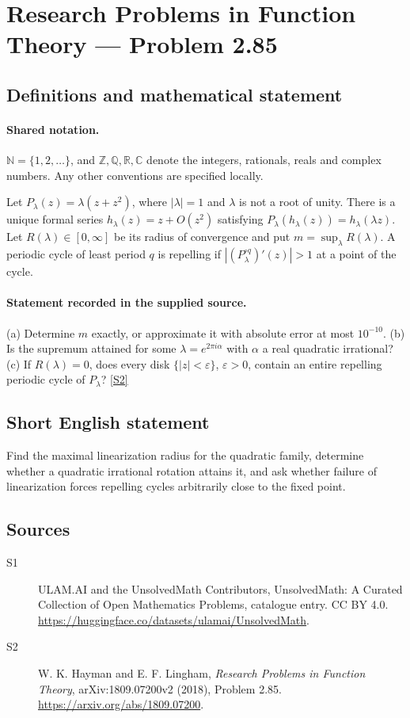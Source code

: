 \documentclass[11pt]{article}
\newcommand{\sref}[2]{\hyperlink{source:#1:#2}{[S#2]}}
\begin{document}
\section{Research Problems in Function Theory — Problem 2.85}\label{statement}

\subsection{Definitions and mathematical statement}

\paragraph{Shared notation.}$\mathbb N=\{1,2,\ldots\}$, and $\mathbb Z,\mathbb Q,\mathbb R,\mathbb C$ denote the integers, rationals, reals and complex numbers. Any other conventions are specified locally.


Let $P_\lambda(z)=\lambda(z+z^2)$, where $|\lambda|=1$ and $\lambda$ is not a root of unity. There is a unique formal series $h_\lambda(z)=z+O(z^2)$ satisfying $P_\lambda(h_\lambda(z))=h_\lambda(\lambda z)$. Let $R(\lambda)\in[0,\infty]$ be its radius of convergence and put $m=\sup_\lambda R(\lambda)$. A periodic cycle of least period $q$ is repelling if $|(P_\lambda^{\circ q})'(z)|>1$ at a point of the cycle.
\paragraph{Statement recorded in the supplied source.}
(a) Determine $m$ exactly, or approximate it with absolute error at most $10^{-10}$. (b) Is the supremum attained for some $\lambda=e^{2\pi i\alpha}$ with $\alpha$ a real quadratic irrational? (c) If $R(\lambda)=0$, does every disk $\{|z|<\varepsilon\}$, $\varepsilon>0$, contain an entire repelling periodic cycle of $P_\lambda$? \sref{statement}{2}
\subsection{Short English statement}
Find the maximal linearization radius for the quadratic family, determine whether a quadratic irrational rotation attains it, and ask whether failure of linearization forces repelling cycles arbitrarily close to the fixed point.
\subsection{Sources}
\begin{description}
\item[\hypertarget{source:statement:1}{S1}] ULAM.AI and the UnsolvedMath Contributors, UnsolvedMath: A Curated Collection of Open Mathematics Problems, catalogue entry. CC BY 4.0. \url{https://huggingface.co/datasets/ulamai/UnsolvedMath}.
\item[\hypertarget{source:statement:2}{S2}] W. K. Hayman and E. F. Lingham, \emph{Research Problems in Function Theory}, arXiv:1809.07200v2 (2018), Problem 2.85. \url{https://arxiv.org/abs/1809.07200}.
\end{description}
\label{end:statement}
\end{document}
